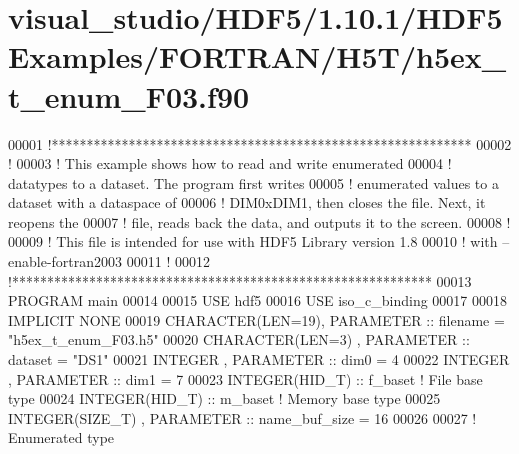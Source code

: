 \hypertarget{visual__studio_2_h_d_f5_21_810_81_2_h_d_f5_examples_2_f_o_r_t_r_a_n_2_h5_t_2h5ex__t__enum___f03_8f90_source}{}\section{visual\+\_\+studio/\+H\+D\+F5/1.10.1/\+H\+D\+F5\+Examples/\+F\+O\+R\+T\+R\+A\+N/\+H5\+T/h5ex\+\_\+t\+\_\+enum\+\_\+\+F03.f90}
\label{visual__studio_2_h_d_f5_21_810_81_2_h_d_f5_examples_2_f_o_r_t_r_a_n_2_h5_t_2h5ex__t__enum___f03_8f90_source}

\begin{DoxyCode}
00001 \textcolor{comment}{!************************************************************}
00002 \textcolor{comment}{!}
00003 \textcolor{comment}{!  This example shows how to read and write enumerated}
00004 \textcolor{comment}{!  datatypes to a dataset.  The program first writes}
00005 \textcolor{comment}{!  enumerated values to a dataset with a dataspace of}
00006 \textcolor{comment}{!  DIM0xDIM1, then closes the file.  Next, it reopens the}
00007 \textcolor{comment}{!  file, reads back the data, and outputs it to the screen.}
00008 \textcolor{comment}{!}
00009 \textcolor{comment}{!  This file is intended for use with HDF5 Library version 1.8}
00010 \textcolor{comment}{!  with --enable-fortran2003}
00011 \textcolor{comment}{!}
00012 \textcolor{comment}{!************************************************************}
00013 \textcolor{keyword}{PROGRAM} main
00014 
00015   \textcolor{keywordtype}{USE }hdf5
00016   \textcolor{keywordtype}{USE }iso\_c\_binding
00017 
00018   \textcolor{keywordtype}{IMPLICIT NONE}
00019   \textcolor{keywordtype}{CHARACTER(LEN=19)}, \textcolor{keywordtype}{PARAMETER} :: filename  = \textcolor{stringliteral}{"h5ex\_t\_enum\_F03.h5"}
00020   \textcolor{keywordtype}{CHARACTER(LEN=3)} , \textcolor{keywordtype}{PARAMETER} :: dataset   = \textcolor{stringliteral}{"DS1"}
00021   \textcolor{keywordtype}{INTEGER}          , \textcolor{keywordtype}{PARAMETER} :: dim0      = 4
00022   \textcolor{keywordtype}{INTEGER}          , \textcolor{keywordtype}{PARAMETER} :: dim1      = 7
00023   \textcolor{keywordtype}{INTEGER(HID\_T)}               :: f\_baset  \textcolor{comment}{! File base type}
00024   \textcolor{keywordtype}{INTEGER(HID\_T)}               :: m\_baset  \textcolor{comment}{! Memory base type}
00025   \textcolor{keywordtype}{INTEGER(SIZE\_T)}  , \textcolor{keywordtype}{PARAMETER} :: name\_buf\_size = 16
00026 
00027 \textcolor{comment}{! Enumerated type}

\end{DoxyCode}
